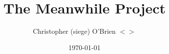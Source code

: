 \documentclass[titlepage,oneside]{book}
\title{The Meanwhile Project}
\author{Christopher (siege) O'Brien $<${\emailLink{}}$>$}
\date{\today}
\begin{document}
\maketitle{}

\tableofcontents{}





\end{document}
